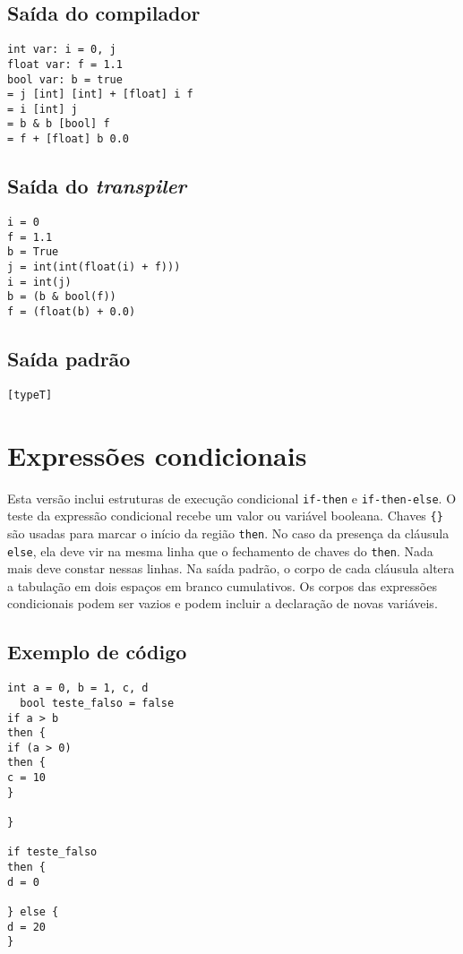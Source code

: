 \documentclass{sftex/sftex}
\begin{document}
\subsection{Saída do compilador}

\begin{verbatim}
int var: i = 0, j
float var: f = 1.1
bool var: b = true
= j [int] [int] + [float] i f
= i [int] j
= b & b [bool] f
= f + [float] b 0.0
\end{verbatim}

\subsection{Saída do \emph{transpiler}}

\begin{verbatim}
i = 0
f = 1.1
b = True
j = int(int(float(i) + f)))
i = int(j)
b = (b & bool(f))
f = (float(b) + 0.0)
\end{verbatim}

\subsection{Saída padrão}

\begin{verbatim}
[typeT]
\end{verbatim}

\section{Expressões condicionais}

Esta versão inclui estruturas de execução condicional \verb!if-then! e
\verb!if-then-else!. O teste da expressão condicional recebe um valor ou
variável booleana. Chaves \verb!{}! são usadas para marcar o início da
região \verb!then!. No caso da presença da cláusula \verb!else!, ela deve
vir na mesma linha que o fechamento de chaves do \verb!then!. Nada mais deve
constar nessas linhas. Na saída padrão, o corpo de cada cláusula altera a
tabulação em dois espaços em branco cumulativos. Os corpos das expressões
condicionais podem ser vazios e podem incluir a declaração de novas variáveis.

\subsection{Exemplo de código}

\begin{verbatim}
int a = 0, b = 1, c, d
  bool teste_falso = false
if a > b
then {
if (a > 0)
then {
c = 10
}

}

if teste_falso
then {
d = 0

} else {
d = 20
}
\end{verbatim}
\end{document}
